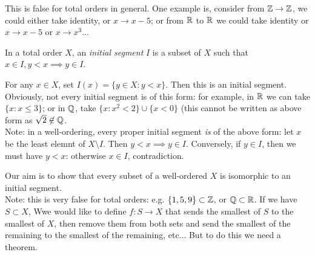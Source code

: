 \documentclass[a4paper]{article}
\begin{document}
\begin{rem}
This is false for total orders in general. One example is, consider from $\mathbb{Z} \to \mathbb{Z}$, we could either take identity, or $x \to x-5$; or from $\mathbb{R}$ to $\mathbb{R}$ we could take identity or $x \to x-5$ or $x\to x^3$...
\end{rem}

\begin{defi}
In a total order $X$, an \emph{initial segment} $I$ is a subset of $X$ such that $x \in I, y < x \implies y \in I$.
\end{defi}

\begin{eg}
For any $x \in X$, set $I(x) = \{y\in X : y < x\}$. Then this is an initial segment.\\
Obviously, not every initial segment is of this form: for example, in $\mathbb{R}$ we can take $\{x:x \leq 3\}$; or in $\mathbb{Q}$, take $\{x:x^2 < 2\} \cup \{x<0\}$ (this cannot be written as above form as $\sqrt{2} \not\in \mathbb{Q}$.\\
Note: in a well-ordering, every proper initial segment \emph{is} of the above form: let $x$ be the least elemnt of $X \setminus I$. Then $y<x \implies y \in I$. Conversely, if $y \in I$, then we must have $y < x$: otherwise $x \in I$, contradiction.
\end{eg}

Our aim is to show that every subset of a well-ordered $X$ is isomorphic to an initial segment.\\
Note: this is very false for total orders: e.g. $\{1,5,9\} \subset \mathbb{Z}$, or $\mathbb{Q} \subset \mathbb{R}$. If we have $S \subset X$, Wwe would like to define $f:S \to X$ that sends the smallest of $S$ to the smallest of $X$, then remove them from both sets and send the smallest of the remaining to the smallest of the remaining, etc... But to do this we need a theorem.
\end{document}
